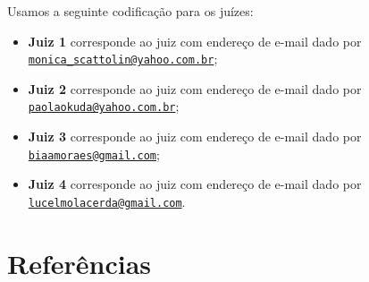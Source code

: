\documentclass[
]{article}
\providecommand{\tightlist}{%
  \setlength{\itemsep}{0pt}\setlength{\parskip}{0pt}}
\begin{document}
\begin{table}[htbp]
\centering
\caption{Cálculo do Coeficiente Kappa de Concordância entre dois juízes.}
\label{tab:kappa}
\end{table}

Usamos a seguinte codificação para os juízes:

\begin{itemize}
\tightlist
\item
  \textbf{Juiz 1} corresponde ao juiz com endereço de e-mail dado por \href{mailto:monica_scattolin@yahoo.com.br}{\nolinkurl{monica\_scattolin@yahoo.com.br}};
\item
  \textbf{Juiz 2} corresponde ao juiz com endereço de e-mail dado por \href{mailto:paolaokuda@yahoo.com.br}{\nolinkurl{paolaokuda@yahoo.com.br}};
\item
  \textbf{Juiz 3} corresponde ao juiz com endereço de e-mail dado por \href{mailto:biaamoraes@gmail.com}{\nolinkurl{biaamoraes@gmail.com}};
\item
  \textbf{Juiz 4} corresponde ao juiz com endereço de e-mail dado por \href{mailto:lucelmolacerda@gmail.com}{\nolinkurl{lucelmolacerda@gmail.com}}.
\end{itemize}

\cleardoublepage

\hypertarget{referuxeancias}{%
\section*{Referências}\label{referuxeancias}}
\end{document}
